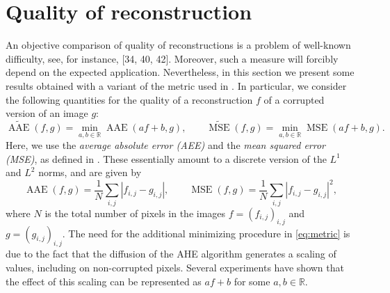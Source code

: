 \documentclass[proc]{edpsmath}
\newcommand{\R}{\mathbb{R}}
\begin{document}
%
%


\section{Quality of reconstruction}\label{sec:comparison}

An objective comparison of quality of reconstructions is a problem of well-known difficulty, see, for instance, [34, 40, 42]. Moreover, such
a measure will forcibly depend on the expected application.
Nevertheless, in this section we present some results obtained with a variant of the metric used in \cite{GWWBBS}.
In particular, we consider the following quantities for the quality of a reconstruction $f$ of a corrupted version of an image $g$:
\begin{equation}\label{eq:metric}
  \widetilde{\operatorname{AAE}}(f,g) = \min_{a,b\in\mathbb R}\operatorname{AAE}(a f+b,g),\qquad
  \widetilde{\operatorname{MSE}}(f,g) = \min_{a,b\in\mathbb R}\operatorname{MSE}(a f+b,g).
\end{equation}
Here, we use the \emph{average absolute error (AEE)} and the \emph{mean squared error (MSE)}, as defined in \cite{GWWBBS}. These essentially amount to a discrete version of the $L^1$ and $L^2$ norms, and are given by
\begin{equation}
  \operatorname{AAE}(f,g) = \frac{1}{N}\sum_{i,j} |f_{i,j}-g_{i,j}|,\qquad
  \operatorname{MSE}(f,g) = \frac{1}{N}\sum_{i,j} |f_{i,j}-g_{i,j}|^2,
\end{equation}
where $N$ is the total number of pixels in the images $f=(f_{i,j})_{i,j}$ and $g=(g_{i,j})_{i,j}$. 
The need for the additional minimizing procedure in \eqref{eq:metric} is due to the fact that the diffusion of the AHE algorithm generates a scaling of values, including on non-corrupted pixels. Several experiments have shown that the effect of this scaling can be represented as $a f+b$ for some $a,b\in\R$.
\end{document}
